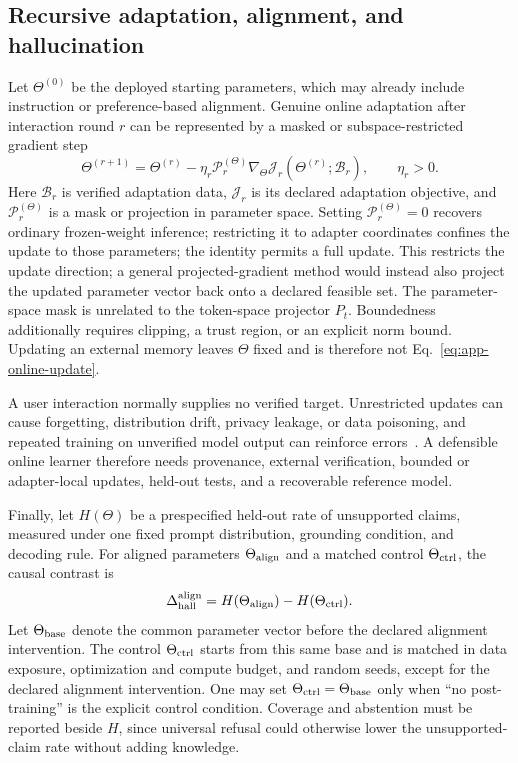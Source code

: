 \documentclass[
  aps,
  reprint,
  superscriptaddress,
  floatfix,
  nofootinbib,
  longbibliography
]{revtex4-2}
\begin{document}
\subsection{Recursive adaptation, alignment, and hallucination}
\label{app:online}

Let $\Theta^{(0)}$ be the deployed starting parameters, which may already
include instruction or preference-based alignment.  Genuine online adaptation
after interaction round $r$ can be represented by a masked or
subspace-restricted gradient step
%
\begin{equation}
\label{eq:app-online-update}
\Theta^{(r+1)}
=\Theta^{(r)}-\eta_r\mathcal P_r^{(\Theta)}
\nabla_\Theta\mathcal J_r
(\Theta^{(r)};\mathcal B_r),
\qquad \eta_r>0.
\end{equation}
%
Here $\mathcal B_r$ is verified adaptation data, $\mathcal J_r$ is its declared
adaptation objective, and $\mathcal P_r^{(\Theta)}$ is a mask or projection in
parameter space.  Setting $\mathcal P_r^{(\Theta)}=0$ recovers ordinary
frozen-weight inference; restricting it to adapter coordinates confines the
update to those parameters; the identity permits a full update.  This restricts
the update direction; a general projected-gradient method would instead also
project the updated parameter vector back onto a declared feasible set.
The parameter-space mask is unrelated to the token-space projector $P_t$.
Boundedness additionally requires clipping,
a trust region, or an explicit norm bound.  Updating an external memory leaves
$\Theta$ fixed and is therefore not Eq.~\eqref{eq:app-online-update}.

A user interaction normally supplies no verified target.  Unrestricted
updates can cause forgetting, distribution drift, privacy leakage, or data
poisoning, and repeated training on unverified model output can reinforce
errors~\cite{herel2024collapse}.  A defensible online learner therefore needs
provenance, external verification, bounded or adapter-local updates, held-out
tests, and a recoverable reference model.

Finally, let $H(\Theta)$ be a prespecified held-out rate of unsupported claims,
measured under one fixed prompt distribution, grounding condition, and
decoding rule.  For aligned parameters $\Theta_{\rm align}$ and a matched
control $\Theta_{\rm ctrl}$, the causal contrast is
%
\begin{equation}
\label{eq:app-hallucination-test}
\Delta_{\rm hall}^{\rm align}
=H(\Theta_{\rm align})-H(\Theta_{\rm ctrl}).
\end{equation}
%
Let $\Theta_{\rm base}$ denote the common parameter vector before the declared
alignment intervention.  The control $\Theta_{\rm ctrl}$ starts from this same
base and is matched in
data exposure, optimization and compute budget, and random seeds, except for
the declared alignment intervention.  One may set
$\Theta_{\rm ctrl}=\Theta_{\rm base}$ only when ``no post-training'' is the
explicit control condition.  Coverage and abstention must be reported beside
$H$, since universal refusal could otherwise lower the unsupported-claim rate
without adding knowledge.
\end{document}
